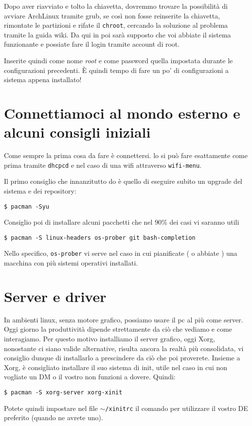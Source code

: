 \documentclass[twoside,italian]{book}
\newcommand{\code}[1]{\texttt{#1}}
\newcommand{\arch}{ArchLinux}
\begin{document}
Dopo aver riavviato e tolto la chiavetta, dovremmo trovare la possibilità di avviare \arch{} tramite grub, se così non fosse reinserite la chiavetta, rimontate le partizioni e rifate il \code{chroot}, cercando la soluzione al problema tramite la guida wiki.
Da qui in poi sarà supposto che voi abbiate il sistema funzionante e possiate fare il login tramite account di root.

Inserite quindi come nome \textit{root} e come password quella impostata durante le configurazioni precedenti. È quindi tempo di fare un po' di configurazioni a sistema appena installato!

\section{Connettiamoci al mondo esterno e alcuni consigli iniziali}

    Come sempre la prima cosa da fare è connettersi. lo si può fare esattamente come prima tramite \code{dhcpcd} e nel caso di una wifi attraverso \code{wifi-menu}.

    Il primo consiglio che innanzitutto do è quello di eseguire subito un upgrade del sistema e dei repository:
    \begin{lstlisting}
$ pacman -Syu
    \end{lstlisting}
    Consiglio poi di installare alcuni pacchetti che nel 90\% dei casi vi saranno utili
    \begin{lstlisting}
$ pacman -S linux-headers os-prober git bash-completion
    \end{lstlisting}
    Nello specifico, \code{os-prober} vi serve nel caso in cui pianificate ( o abbiate ) una macchina con più sistemi operativi installati.

\section{Server e driver}

    In ambienti linux, senza motore grafico, possiamo usare il pc al più come server. Oggi giorno la produttività dipende strettamente da ciò che vediamo e come interagiamo. Per questo motivo installiamo il server grafico, oggi Xorg, nonostante ci siano valide alternative, risulta ancora la realtà più consolidata, vi consiglio dunque di installarlo a prescindere da ciò che poi proverete. Insieme a Xorg, è consigliato installare il suo sistema di init, utile nel caso in cui non vogliate un DM o il vostro non funzioni a dovere. Quindi:
    \begin{lstlisting}
$ pacman -S xorg-server xorg-xinit
    \end{lstlisting}
    Potete quindi impostare nel file \code{$\sim$/xinitrc} il comando per utilizzare  il vostro DE preferito (quando ne avrete uno).
\end{document}
